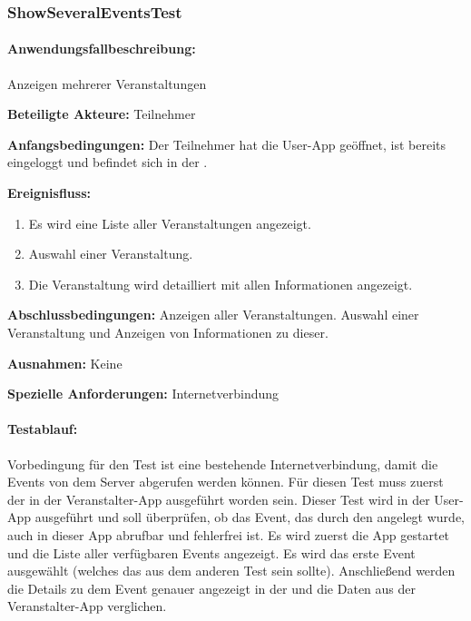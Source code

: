 \subsubsection{ShowSeveralEventsTest}
\paragraph{Anwendungsfallbeschreibung:} Anzeigen mehrerer Veranstaltungen

\textbf{Beteiligte Akteure:}
	Teilnehmer
	
\textbf{Anfangsbedingungen:}
	Der Teilnehmer hat die User-App geöffnet, ist bereits eingeloggt und befindet sich in der .
	
\textbf{Ereignisfluss:}
	\begin{enumerate}
		\item Es wird eine Liste aller Veranstaltungen angezeigt.
		\item Auswahl einer Veranstaltung.
		\item Die Veranstaltung wird detailliert mit allen Informationen angezeigt.
	\end{enumerate}
	
\textbf{Abschlussbedingungen:}
	Anzeigen aller Veranstaltungen. Auswahl einer Veranstaltung und Anzeigen von Informationen zu dieser.
	
\textbf{Ausnahmen:}
	Keine
	
\textbf{Spezielle Anforderungen:}
	Internetverbindung

\paragraph{Testablauf:}
Vorbedingung für den Test ist eine bestehende Internetverbindung, damit die Events von dem Server abgerufen werden können.
Für diesen Test muss zuerst der  in der Veranstalter-App ausgeführt worden sein. Dieser Test wird in der User-App ausgeführt und soll überprüfen, ob das Event, das durch den  angelegt wurde, auch in dieser App abrufbar und fehlerfrei ist.
Es wird zuerst die App gestartet und die Liste aller verfügbaren Events angezeigt. Es wird das erste Event ausgewählt (welches das aus dem anderen Test sein sollte). Anschließend werden die Details zu dem Event genauer angezeigt in der  und die Daten aus der Veranstalter-App verglichen.
